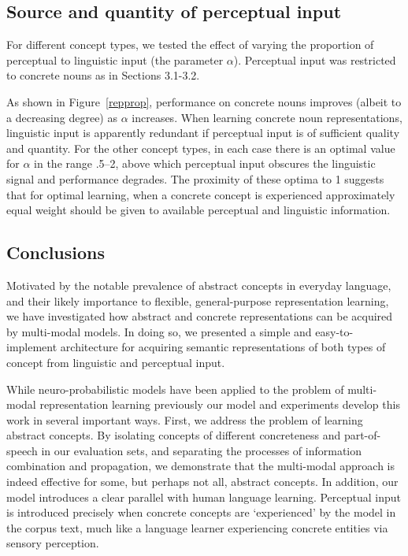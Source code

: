 \subsection{Source and quantity of perceptual input} For different concept types, we tested the effect of varying the proportion of perceptual to linguistic input (the parameter \(\alpha\)). Perceptual input was restricted to concrete nouns as in Sections 3.1-3.2. 

As shown in Figure~\ref{repprop}, performance on concrete nouns improves (albeit to a decreasing degree) as \( \alpha \) increases. When learning concrete noun representations, linguistic input is apparently redundant if perceptual input is of sufficient quality and quantity. For the other concept types, in each case there is an optimal value for \( \alpha \) in the range .5--2, above which perceptual input obscures the linguistic signal and performance degrades. The proximity of these optima to 1 suggests that  for optimal learning, when a concrete concept is experienced approximately equal weight should be given to available perceptual and linguistic information. 

\subsection{Conclusions}

Motivated by the notable prevalence of abstract concepts in everyday language, and their likely importance to flexible, general-purpose representation learning, we have investigated how abstract and concrete representations can be acquired by multi-modal models. In doing so, we presented a simple and easy-to-implement architecture for acquiring semantic representations of both types of concept from linguistic and perceptual input. 

While neuro-probabilistic models have been applied to the problem of multi-modal representation learning previously \cite{srivastava2012multimodal,wu2013online} our model and experiments develop this work in several important ways. First, we address the problem of learning abstract concepts. By isolating concepts of different concreteness and part-of-speech in our evaluation sets, and separating the processes of information combination and propagation, we demonstrate that the multi-modal approach is indeed effective for some, but perhaps not all, abstract concepts. In addition, our model introduces a clear parallel with human language learning. Perceptual input is introduced precisely when concrete concepts are `experienced' by the model in the corpus text, much like a language learner experiencing concrete entities via sensory perception.  

